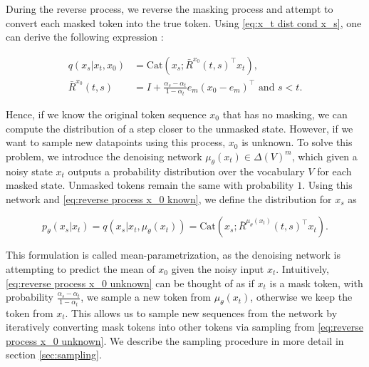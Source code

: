 During the reverse process, we reverse the masking process and attempt to convert each masked token into the true token. Using \eqref{eq:x_t dist cond x_s}, one can derive the following expression \cite{shi2025simplifiedgeneralizedmaskeddiffusion}:

\begin{align}
    q(x_s | x_t, x_0) &= \text{Cat}(x_s; \bar{R}^{x_0}(t, s)^\top x_t), \label{eq:reverse process x_0 known}\\
    \bar{R}^{x_0}(t, s) &= I + \frac{\alpha_s - \alpha_t}{1 - \alpha_t}e_m(x_0 - e_m)^\top \text{ and } s < t.\nonumber
\end{align}

Hence, if we know the original token sequence $x_0$ that has no masking, we can compute the distribution of a step closer to the unmasked state. However, if we want to sample new datapoints using this process, $x_0$ is unknown. To solve this problem, we introduce the denoising network $\mu_\theta(x_t)\in\Delta(V)^m$, which given a noisy state $x_t$ outputs a probability distribution over the vocabulary $V$ for each masked state. Unmasked tokens remain the same with probability $1$. Using this network and \eqref{eq:reverse process x_0 known}, we define the distribution for $x_s$ as

\begin{equation}
    p_\theta(x_s | x_t) = q(x_s | x_t, \mu_\theta(x_t)) = \text{Cat}(x_s; \bar{R}^{\mu_\theta(x_t)}(t, s)^\top x_t).
    \label{eq:reverse process x_0 unknown}
\end{equation}

This formulation is called mean-parametrization, as the denoising network is attempting to predict the mean of $x_0$ given the noisy input $x_t$. Intuitively, \eqref{eq:reverse process x_0 unknown} can be thought of as if $x_t$ is a mask token, with probability $\frac{\alpha_s - \alpha_t}{1 - \alpha_t}$, we sample a new token from $\mu_\theta(x_t)$, otherwise we keep the token from $x_t$. This allows us to sample new sequences from the network by iteratively converting mask tokens into other tokens via sampling from \eqref{eq:reverse process x_0 unknown}. We describe the sampling procedure in more detail in section \ref{sec:sampling}.




